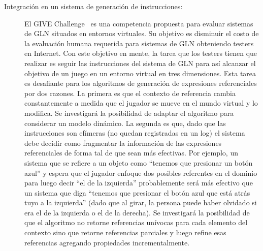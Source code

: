 \begin{description}
\item[Integraci\'on en un sistema de generaci\'on de instrucciones:] El GIVE Challenge~\cite{} es una competencia propuesta para evaluar sistemas de GLN situados en entornos virtuales. Su objetivo es disminuir el costo de la evaluaci\'on humana requerida para sistemas de GLN obteniendo testers en Internet. Con este objetivo en mente, la tarea que los testers tienen que realizar es seguir las instrucciones del sistema de GLN para as\'i alcanzar el objetivo de un juego en un entorno virtual en tres dimensiones. Esta tarea es desafiante para los algoritmos de generaci\'on de expresiones referenciales por dos razones. La primera es que el contexto de referencia cambia constantemente a medida que el jugador se mueve en el mundo virtual y lo modifica. Se investigar\'a la posibilidad de adaptar el algoritmo para considerar un modelo din\'amico. La segunda es que, dado que las instrucciones son ef\'imeras (no quedan registradas en un log) el sistema debe decidir como fragmentar la informaci\'on de las expresiones referenciales de forma tal de que sean m\'as efectivas. Por ejemplo, un sistema que se refiere a un objeto como ``tenemos que presionar un bot\'on azul'' y espera que el jugador enfoque dos posibles referentes en el dominio para luego decir ``el de la izquierda'' probablemente ser\'a m\'as efectivo que un sistema que diga ``tenemos que presionar el bot\'on azul que est\'a atr\'as tuyo a la izquierda'' (dado que al girar, la persona puede haber olvidado si era el de la izquierda o el de la derecha). Se investigar\'a la posibilidad de que el algoritmo no retorne referencias un\'ivocas para cada elemento del contexto sino que retorne referencias parciales y luego refine esas referencias agregando propiedades incrementalmente. 
\end{description}

